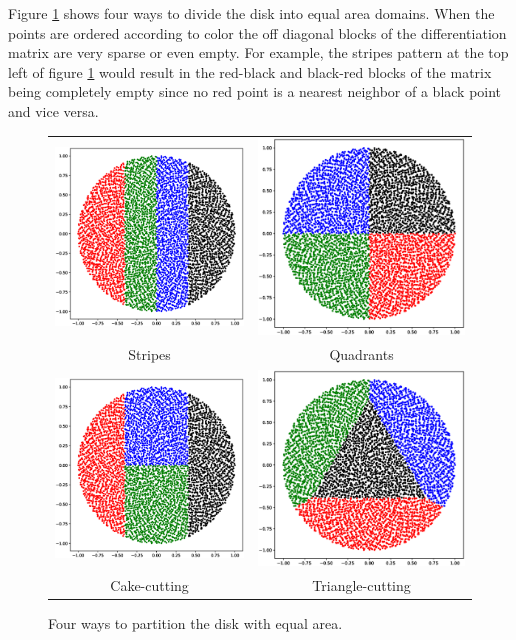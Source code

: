 \documentclass[12pt]{article}
\begin{document}
Figure \ref{decomp_strategies} shows four ways to divide the disk into equal area domains. When the points are ordered according to color the off diagonal blocks of the differentiation matrix are very sparse or even empty. For example, the stripes pattern at the top left of figure \ref{decomp_strategies} would result in the red-black and black-red blocks of the matrix being completely empty since no red point is a nearest neighbor of a black point and vice versa. 

\begin{figure}[ht]
	\centering
	\begin{tabular}{cc}
		\includegraphics[width=.4\textwidth]{disk_decomp_strips.eps} & \includegraphics[width=.4\textwidth]{disk_decomp_quad.eps} \\
		Stripes & Quadrants \\
		\includegraphics[width=.4\textwidth]{disk_decomp_cake.eps} & \includegraphics[width=.4\textwidth]{disk_decomp_triangle.eps} \\
		Cake-cutting & Triangle-cutting
	\end{tabular}
	\caption{Four ways to partition the disk with equal area.} \label{decomp_strategies}
\end{figure}
\end{document}
